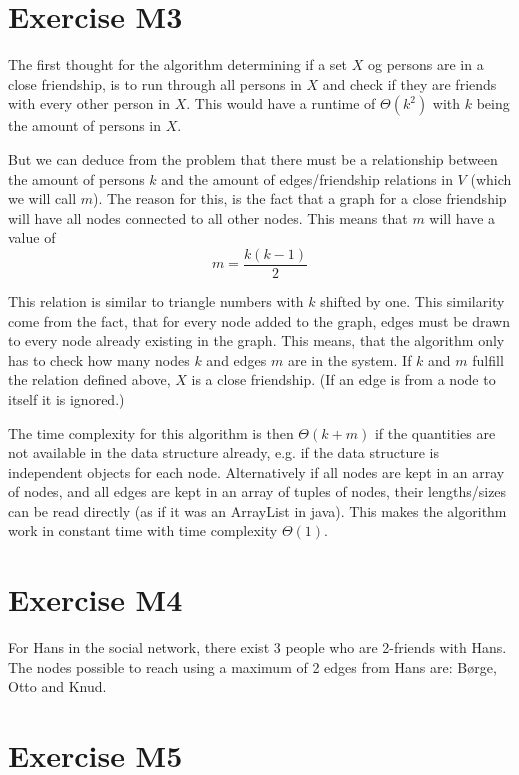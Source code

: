 \documentclass[10pt]{article}
\begin{document}
\section*{Exercise M3}

The first thought for the algorithm determining if a set $X$ og persons are in a close friendship, is to run through all persons in $X$ and check if they are friends with every other person in $X$. This would have a runtime of $\Theta(k^2)$ with $k$ being the amount of persons in $X$. 

But we can deduce from the problem that there must be a relationship between the amount of persons $k$ and the amount of edges/friendship relations in $V$ (which we will call $m$). The reason for this, is the fact that a graph for a close friendship will have all nodes connected to all other nodes. This means that $m$ will have a value of 
\begin{equation*}
    m = \frac{k(k-1)}{2}
\end{equation*}

This relation is similar to triangle numbers with $k$ shifted by one. This similarity come from the fact, that for every node added to the graph, edges must be drawn to every node already existing in the graph. This means, that the algorithm only has to check how many nodes $k$ and edges $m$ are in the system. If $k$ and $m$ fulfill the relation defined above, $X$ is a close friendship. (If an edge is from a node to itself it is ignored.)

The time complexity for this algorithm is then $\Theta(k + m)$ if the quantities are not available in the data structure already, e.g. if the data structure is independent objects for each node. Alternatively if all nodes are kept in an array of nodes, and all edges are kept in an array of tuples of nodes, their lengths/sizes can be read directly (as if it was an ArrayList in java). This makes the algorithm work in constant time with time complexity $\Theta(1)$.

\section*{Exercise M4}

For Hans in the social network, there exist 3 people who are 2-friends with Hans. The nodes possible to reach using a maximum of 2 edges from Hans are: Børge, Otto and Knud.

\section*{Exercise M5}
\end{document}
